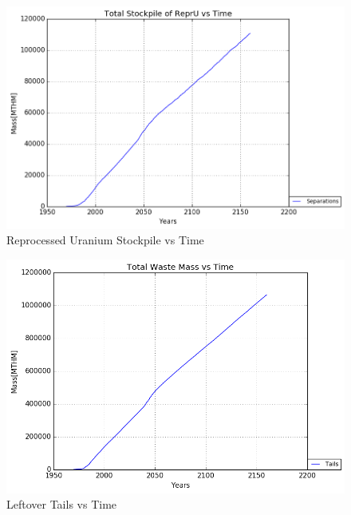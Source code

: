\begin{figure}
	\includegraphics[width=\linewidth]{./images/reprocess/Separations_Total_Stockpile.png}
	\caption{Reprocessed Uranium Stockpile vs Time}
	\label{fig:reprocess_fuel}
\end{figure}

\begin{figure}
	\includegraphics[width=\linewidth]{./images/reprocess/Tails_total_Waste.png}
	\caption{Leftover Tails vs Time}
	\label{fig:reprocess_tails}
\end{figure}

